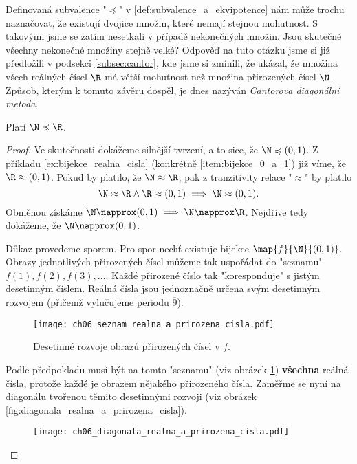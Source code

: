 Definovaná subvalence "$\preccurlyeq$" v \ref{def:subvalence_a_ekvipotence} nám může trochu naznačovat, že existují dvojice množin, které nemají stejnou mohutnost. S takovými jsme se zatím nesetkali v případě nekonečných množin. Jsou skutečně všechny nekonečné množiny stejně velké? Odpověď na tuto otázku jsme si již předložili v podsekci \ref{subsec:cantor}, kde jsme si zmínili, že  ukázal, že množina všech reálných čísel $\R$ má větší mohutnost než množina přirozených čísel $\N$. Způsob, kterým k tomuto závěru dospěl, je dnes nazýván \emph{Cantorova diagonální metoda}.
\begin{theorem}\label{thm:N_a_R}
    Platí $\N\preccurlyeq\R$.
\end{theorem}
\begin{proof}
    Ve skutečnosti dokážeme silnější tvrzení, a to sice, že $\N\preccurlyeq(0,1)$. Z příkladu \ref{ex:bijekce_realna_cisla} (konkrétně \ref{item:bijekce_0_a_1}) již víme, že $\R\approx(0,1)$. Pokud by platilo, že $\N\approx\R$, pak z tranzitivity relace "$\approx$" by platilo
    \begin{equation*}
        \N\approx\R \land \R\approx(0,1) \implies \N\approx(0,1).
    \end{equation*}
    Obměnou získáme $\N\napprox(0,1)\implies\N\napprox\R$. Nejdříve tedy dokážeme, že $\N\napprox(0,1)$.\par
    Důkaz provedeme sporem. Pro spor nechť existuje bijekce $\map{f}{\N}{(0,1)}$. Obrazy jednotlivých přirozených čísel můžeme tak uspořádat do "seznamu" $f(1),f(2),f(3),\dots$. Každé přirozené číslo tak "koresponduje" s jistým desetinným číslem. Reálná čísla jsou jednoznačně určena svým desetinným rozvojem (přičemž vylučujeme periodu $\overline{9}$).
    \begin{figure}[H]
        \centering
        \texttt{[image: ch06\_seznam\_realna\_a\_prirozena\_cisla.pdf]}
        \caption{Desetinné rozvoje obrazů přirozených čísel v $f$.}
        \label{fig:seznam_realna_a_prirozena_cisla}
    \end{figure}
    Podle předpokladu musí být na tomto "seznamu" (viz obrázek \ref{fig:seznam_realna_a_prirozena_cisla}) \textbf{všechna} reálná čísla, protože každé je obrazem nějakého přirozeného čísla. Zaměřme se nyní na diagonálu tvořenou těmito desetinnými rozvoji (viz obrázek \ref{fig:diagonala_realna_a_prirozena_cisla}).
    \begin{figure}[H]
        \centering
        \texttt{[image: ch06\_diagonala\_realna\_a\_prirozena\_cisla.pdf]}

\end{figure}
\end{proof}
